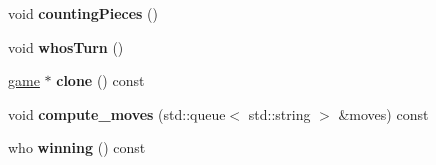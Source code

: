 \begin{DoxyCompactItemize}
\item 
void {\bfseries counting\+Pieces} ()\hypertarget{classmain__savitch__14_1_1Othello_a19f49edfbe82b84922877e00bc854ed8}{}\label{classmain__savitch__14_1_1Othello_a19f49edfbe82b84922877e00bc854ed8}

\item 
void {\bfseries whos\+Turn} ()\hypertarget{classmain__savitch__14_1_1Othello_a21440dbb4511812a76c578a5f546710b}{}\label{classmain__savitch__14_1_1Othello_a21440dbb4511812a76c578a5f546710b}

\item 
\hyperlink{classmain__savitch__14_1_1game}{game} $\ast$ {\bfseries clone} () const \hypertarget{classmain__savitch__14_1_1Othello_ab5a505f8a6ffd860376bf074c57e8a5f}{}\label{classmain__savitch__14_1_1Othello_ab5a505f8a6ffd860376bf074c57e8a5f}

\item 
void {\bfseries compute\+\_\+moves} (std\+::queue$<$ std\+::string $>$ \&moves) const \hypertarget{classmain__savitch__14_1_1Othello_aae15562565348c574b8e4c0b7782d19f}{}\label{classmain__savitch__14_1_1Othello_aae15562565348c574b8e4c0b7782d19f}

\item 
who {\bfseries winning} () const \hypertarget{classmain__savitch__14_1_1Othello_a8934d1b63f73c03dae9629dbe03955d7}{}\label{classmain__savitch__14_1_1Othello_a8934d1b63f73c03dae9629dbe03955d7}

\end{DoxyCompactItemize}
